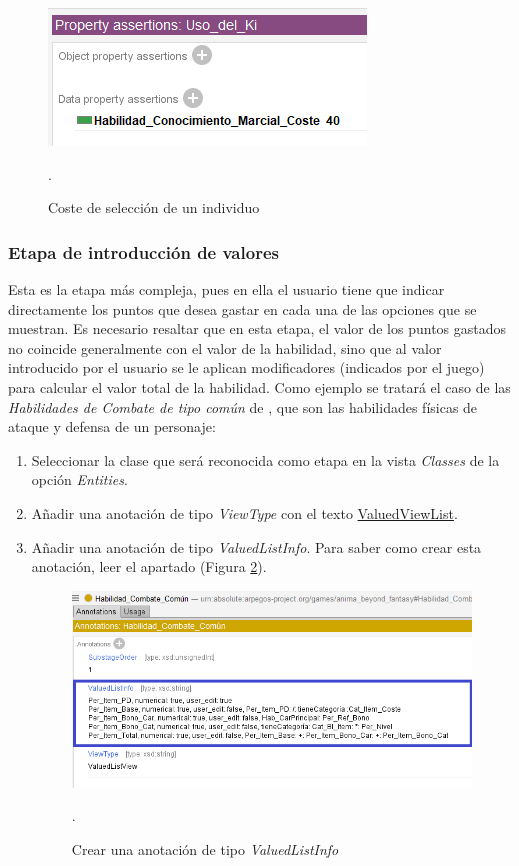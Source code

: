 \begin{figure}[H]
    \centering
    \includegraphics[scale=0.6]{Figures/Protege/Coste_seleccion_individuo.png}
    \caption{Coste de selección de un individuo}.
    \label{Coste_seleccion_individuo}
\end{figure}

\subsubsection{Etapa de introducción de valores}
Esta es la etapa más compleja, pues en ella el usuario tiene que indicar directamente los puntos que desea gastar en cada una 
de las opciones que se muestran. Es necesario resaltar que en esta etapa, el valor de los puntos gastados no coincide generalmente 
con el valor de la habilidad, sino que al valor introducido por el usuario se le aplican modificadores (indicados por el juego) para 
calcular el valor total de la habilidad. Como ejemplo se tratará el caso de las \textit{Habilidades de Combate de tipo común} de \anima, 
que son las habilidades físicas de ataque y defensa de un personaje:

\begin{enumerate}
    \item Seleccionar la clase que será reconocida como etapa en la vista \textit{Classes} de la opción \textit{Entities}.
    \item Añadir una anotación de tipo \textit{ViewType} con el texto \underline{ValuedViewList}.
    \item Añadir una anotación de tipo \textit{ValuedListInfo}. Para saber como crear esta anotación, 
    leer el apartado  (Figura \ref*{ValuedListInfo_End}).

    \begin{figure}[H]
        \centering
        \includegraphics[scale=0.6]{Figures/Protege/ValuedListInfo_End.png}
        \caption{Crear una anotación de tipo \textit{ValuedListInfo}}.
        \label{ValuedListInfo_End}
    \end{figure}
\end{enumerate}

